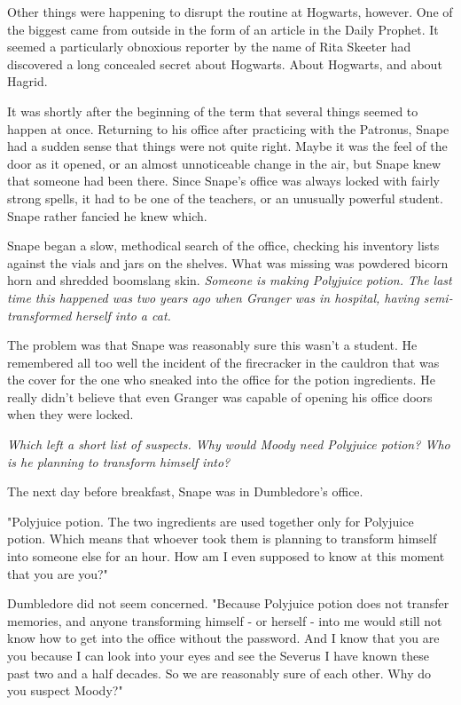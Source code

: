 Other things were happening to disrupt the routine at Hogwarts, however. One of the biggest came from outside in the form of an article in the Daily Prophet. It seemed a particularly obnoxious reporter by the name of Rita Skeeter had discovered a long concealed secret about Hogwarts. About Hogwarts, and about Hagrid.

It was shortly after the beginning of the term that several things seemed to happen at once. Returning to his office after practicing with the Patronus, Snape had a sudden sense that things were not quite right. Maybe it was the feel of the door as it opened, or an almost unnoticeable change in the air, but Snape knew that someone had been there. Since Snape's office was always locked with fairly strong spells, it had to be one of the teachers, or an unusually powerful student. Snape rather fancied he knew which.

Snape began a slow, methodical search of the office, checking his inventory lists against the vials and jars on the shelves. What was missing was powdered bicorn horn and shredded boomslang skin. \emph{Someone is making Polyjuice potion. The last time this happened was two years ago when Granger was in hospital, having semi-transformed herself into a cat.}

The problem was that Snape was reasonably sure this wasn't a student. He remembered all too well the incident of the firecracker in the cauldron that was the cover for the one who sneaked into the office for the potion ingredients. He really didn't believe that even Granger was capable of opening his office doors when they were locked.

\emph{Which left a short list of suspects. Why would Moody need Polyjuice potion? Who is he planning to transform himself into?}

The next day before breakfast, Snape was in Dumbledore's office.

"Polyjuice potion. The two ingredients are used together only for Polyjuice potion. Which means that whoever took them is planning to transform himself into someone else for an hour. How am I even supposed to know at this moment that you are you?"

Dumbledore did not seem concerned. "Because Polyjuice potion does not transfer memories, and anyone transforming himself - or herself - into me would still not know how to get into the office without the password. And I know that you are you because I can look into your eyes and see the Severus I have known these past two and a half decades. So we are reasonably sure of each other. Why do you suspect Moody?"

